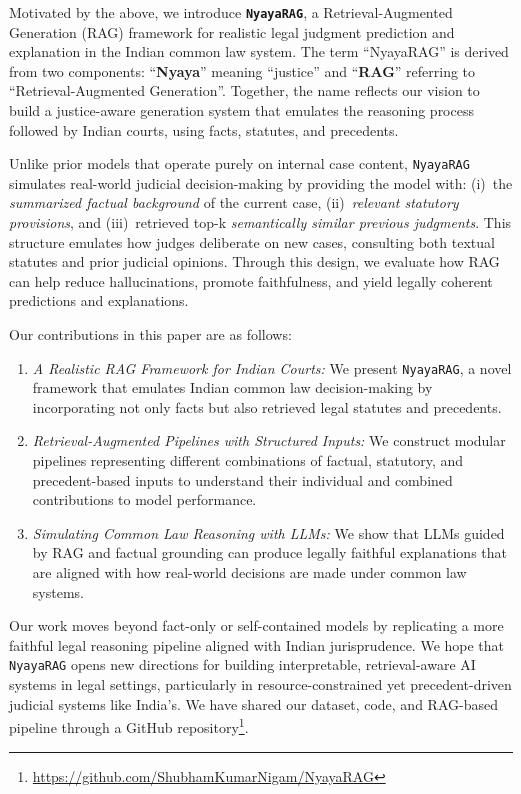 Motivated by the above, we introduce \textbf{\texttt{NyayaRAG}}, a Retrieval-Augmented Generation (RAG) framework for realistic legal judgment prediction and explanation in the Indian common law system. The term ``NyayaRAG'' is derived from two components: ``\textbf{Nyaya}'' meaning ``justice'' and ``\textbf{RAG}'' referring to ``Retrieval-Augmented Generation''. Together, the name reflects our vision to build a justice-aware generation system that emulates the reasoning process followed by Indian courts, using facts, statutes, and precedents.

Unlike prior models that operate purely on internal case content, \texttt{NyayaRAG} simulates real-world judicial decision-making by providing the model with:
(i)~the \emph{summarized factual background} of the current case,
(ii)~\emph{relevant statutory provisions}, and (iii)~retrieved top-k \emph{semantically similar previous judgments}. This structure emulates how judges deliberate on new cases, consulting both textual statutes and prior judicial opinions. Through this design, we evaluate how RAG can help reduce hallucinations, promote faithfulness, and yield legally coherent predictions and explanations.

Our contributions in this paper are as follows:
\begin{enumerate}
    \item \emph{A Realistic RAG Framework for Indian Courts:} We present \texttt{NyayaRAG}, a novel framework that emulates Indian common law decision-making by incorporating not only facts but also retrieved legal statutes and precedents.
    
    \item \emph{Retrieval-Augmented Pipelines with Structured Inputs:} We construct modular pipelines representing different combinations of factual, statutory, and precedent-based inputs to understand their individual and combined contributions to model performance.


    \item \emph{Simulating Common Law Reasoning with LLMs:} We show that LLMs guided by RAG and factual grounding can produce legally faithful explanations that are aligned with how real-world decisions are made under common law systems.
\end{enumerate}

Our work moves beyond fact-only or self-contained models by replicating a more faithful legal reasoning pipeline aligned with Indian jurisprudence. We hope that \texttt{NyayaRAG} opens new directions for building interpretable, retrieval-aware AI systems in legal settings, particularly in resource-constrained yet precedent-driven judicial systems like India's. We have shared our dataset, code, and RAG-based pipeline through a GitHub repository\footnote{\href{https://github.com/ShubhamKumarNigam/NyayaRAG}{https://github.com/ShubhamKumarNigam/NyayaRAG}}. 


